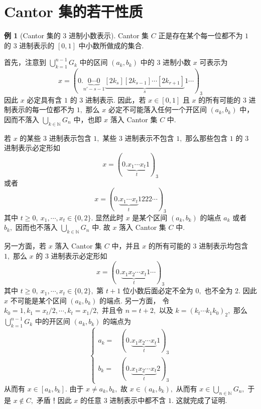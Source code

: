 \documentclass[12pt, a4paper, oneside]{book}
\numberwithin{figure}{section}
\theoremstyle{definition}
\newtheorem{example}[theorem]{例}
\begin{document}
\section{Cantor 集的若干性质}
\begin{example}[Cantor 集的 $3$ 进制小数表示]\label{base 3 description of the Cantor set}
    Cantor 集 $C$ 正是存在某个每一位都不为 $1$ 的 $3$ 进制表示的 $[0,1]$ 中小数所做成的集合.
\end{example}
首先，注意到 $\bigcup_{k=1}^{n-1} G_k$ 中的区间 $(a_k,b_k)$ 中的 $3$ 进制小数 $x$ 可表示为
\begin{equation}
    x=(0.\underbrace{0\cdots 0}_{n'-s-1}\underbrace{[2k_s][2k_{s-1}]\cdots [2k_{r+1}]}_{s} 1\cdots)_3
\end{equation}
因此 $x$ 必定具有含 $1$ 的 $3$ 进制表示. 因此，若 $x\in [0,1]$ 且 $x$ 的所有可能的 $3$ 进制表示的每一位都不为 $1,$ 那么 $x$ 必定不可能落入任何一个开区间 $(a_k,b_k)$ 中，因而不落入 $\bigcup_{k\in\mathbb N}G_n$ 中，也即 $x$ 落入 Cantor 集 $C$ 中.

若 $x$ 的某些 $3$ 进制表示包含 $1,$ 某些 $3$ 进制表示不包含 $1,$ 那么那些包含 $1$ 的 $3$ 进制表示必定形如 
\begin{equation}
    x=(0.\underbrace{x_1\cdots x_t}_{t}1)_3
\end{equation}
或者
\begin{equation}
    x=(0.\underbrace{x_1\cdots x_t}_{t}1222\cdots)_3
\end{equation}
其中 $t\geq 0,\ x_1,\cdots,x_t\in\{0,2\}.$ 显然此时 $x$ 是某个区间 $(a_k,b_k)$ 的端点 $a_k$ 或者 $b_k,$ 因而也不落入 $\bigcup_{k\in\mathbb N}G_n$ 中. 故 $x$ 落入 Cantor 集 $C$ 中.


另一方面，若 $x$ 落入 Cantor 集 $C$ 中，并且 $x$ 的所有可能的 $3$ 进制表示均包含 $1,$ 那么 $x$ 的 $3$ 进制表示必定形如
\begin{equation}
    x=(0.\underbrace{x_1x_2\cdots x_t}_{t} 1\cdots)_3
\end{equation}
其中 $t\geq 0,\ x_1,\cdots,x_t\in\{0,2\},$
第 $t+1$ 位小数后面必定不全为 $0,$ 也不全为 $2.$ 因此 $x$ 不可能是某个区间 $(a_k,b_k)$ 的端点. 另一方面，
 令 $k_0=1,k_1=x_t/2,\cdots,k_t=x_1/2,$ 并且令 $n=t+2,$ 以及 $k=(k_t\cdots k_1k_0)_2,$ 那么 $\bigcup_{k=1}^{n-1}G_k$ 中的开区间 $(a_k,b_k)$ 的端点为
\begin{equation}
    \left\{
        \begin{aligned}
            a_k =&(0.\underbrace{x_1x_2\cdots x_t}_{t}1)_3\\
            b_k =&(0.\underbrace{x_1x_2\cdots x_t}_{t}2)_3
        \end{aligned}
    \right.
\end{equation}
从而有 $x\in [a_k,b_k].$ 由于 $x\neq a_k,b_k,$ 故 $x\in (a_k,b_k),$ 从而有 $x\in \bigcup_{n\in\mathbb N}G_n,$ 于是 $x\notin C,$ 矛盾！因此 $x$ 的任意 $3$ 进制表示中都不含 $1.$ 这就完成了证明.
\end{document}
